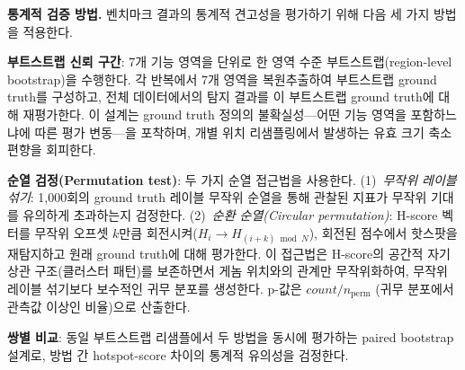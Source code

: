 \textbf{통계적 검증 방법.}
\label{subsec:statistical_methods}
벤치마크 결과의 통계적 견고성을 평가하기 위해 다음 세 가지 방법을 적용한다.

\textbf{부트스트랩 신뢰 구간}: 7개 기능 영역을 단위로 한 영역 수준 부트스트랩(region-level bootstrap)을 수행한다.
각 반복에서 7개 영역을 복원추출하여 부트스트랩 ground truth를 구성하고, 전체 데이터에서의 탐지 결과를 이 부트스트랩 ground truth에 대해 재평가한다.
이 설계는 ground truth 정의의 불확실성---어떤 기능 영역을 포함하느냐에 따른 평가 변동---을 포착하며, 개별 위치 리샘플링에서 발생하는 유효 크기 축소 편향을 회피한다.

\textbf{순열 검정(Permutation test)}: 두 가지 순열 접근법을 사용한다.
(1)~\textit{무작위 레이블 섞기}: 1,000회의 ground truth 레이블 무작위 순열을 통해 관찰된 지표가 무작위 기대를 유의하게 초과하는지 검정한다.
(2)~\textit{순환 순열(Circular permutation)}: H-score 벡터를 무작위 오프셋 $k$만큼 회전시켜($H_i \rightarrow H_{(i+k) \bmod N}$), 회전된 점수에서 핫스팟을 재탐지하고 원래 ground truth에 대해 평가한다.
이 접근법은 H-score의 공간적 자기상관 구조(클러스터 패턴)를 보존하면서 게놈 위치와의 관계만 무작위화하여, 무작위 레이블 섞기보다 보수적인 귀무 분포를 생성한다.
p-값은 $count / n_{\text{perm}}$ (귀무 분포에서 관측값 이상인 비율)으로 산출한다.

\textbf{쌍별 비교}: 동일 부트스트랩 리샘플에서 두 방법을 동시에 평가하는 paired bootstrap 설계로, 방법 간 hotspot-score 차이의 통계적 유의성을 검정한다.
